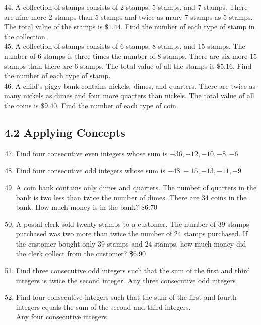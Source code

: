 \documentclass{ximera}
\begin{document}
44. A collection of stamps consists of 2\textcent{} stamps, 5\textcent{} stamps, and 7\textcent{} stamps. There are nine more 2\textcent{} stamps than 5\textcent{} stamps and twice as many 7\textcent{} stamps as 5\textcent{} stamps. The total value of the stamps is $\$ 1.44$. Find the number of each type of stamp in the collection.\\
45. A collection of stamps consists of 6\textcent{} stamps, 8\textcent{} stamps, and 15\textcent{} stamps. The number of 6\textcent{} stamps is three times the number of 8\textcent{} stamps. There are six more 15\textcent{} stamps than there are 6\textcent{} stamps. The total value of all the stamps is $\$ 5.16$. Find the number of each type of stamp.\\
46. A child's piggy bank contains nickels, dimes, and quarters. There are twice as many nickels as dimes and four more quarters than nickels. The total value of all the coins is $\$ 9.40$. Find the number of each type of coin.

\subsection*{4.2 Applying Concepts}
\begin{enumerate}
  \setcounter{enumi}{46}
  \item Find four consecutive even integers whose sum is $-36,-12,-10,-8,-6$
  \item Find four consecutive odd integers whose sum is $-48 .-15,-13,-11,-9$
  \item A coin bank contains only dimes and quarters. The number of quarters in the bank is two less than twice the number of dimes. There are 34 coins in the bank. How much money is in the bank? $\$ 6.70$
  \item A postal clerk sold twenty stamps to a customer. The number of 39\textcent{} stamps purchased was two more than twice the number of 24\textcent{} stamps purchased. If the customer bought only 39\textcent{} stamps and 24\textcent{} stamps, how much money did the clerk collect from the customer? \$6.90
  \item Find three consecutive odd integers such that the sum of the first and third integers is twice the second integer. Any three consecutive odd integers
  \item Find four consecutive integers such that the sum of the first and fourth integers equals the sum of the second and third integers.\\
Any four consecutive integers
\end{enumerate}
\end{document}
